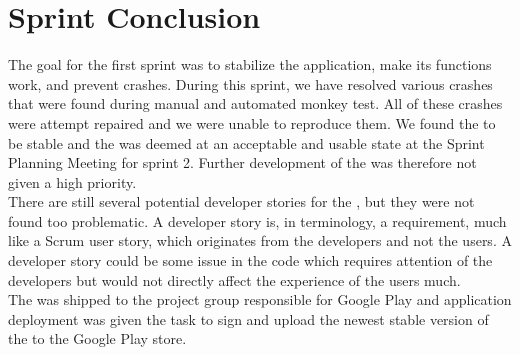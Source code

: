 
\chapter{Sprint Conclusion}
\label{cha:conclusion_sprint_1}

The goal for the first sprint was to stabilize the \launcher application, make its functions work, and prevent crashes. During this sprint, we have resolved various crashes that were found during manual and automated monkey test. All of these crashes were attempt repaired and we were unable to reproduce them. We found the \launcher to be stable and the \launcher was deemed at an acceptable and usable state at the Sprint Planning Meeting for sprint 2. Further development of the \launcher was therefore not given a high priority. \\

There are still several potential developer stories for the \launcher, but they were not found too problematic. A developer story is, in \giraf terminology, a requirement, much like a Scrum user story, which originates from the developers and not the users. A developer story could be some issue in the code which requires attention of the developers but would not directly affect the experience of the users much.\\    

The \launcher was shipped to the project group responsible for Google Play and application deployment was given the task to sign and upload the newest stable version of the \launcher to the Google Play store. 






